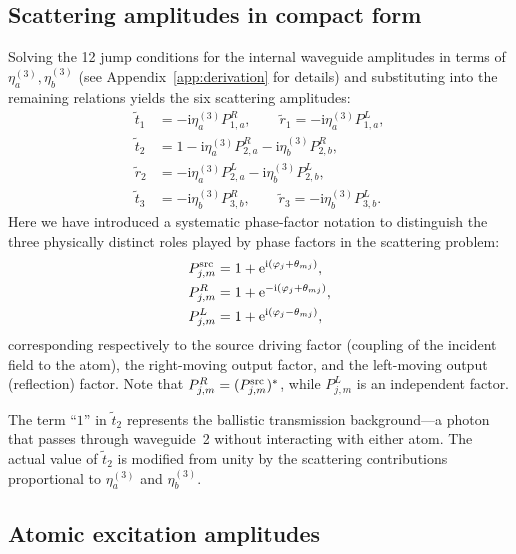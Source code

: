 \documentclass[aps,pra,reprint,superscriptaddress,nofootinbib,longbibliography,floatfix]{revtex4-2}
\newcommand{\ii}{\mathrm{i}}
\newcommand{\ee}{\mathrm{e}}
\newcommand{\ph}{\varphi}
\begin{document}
\subsection{Scattering amplitudes in compact form}

Solving the 12 jump conditions for the internal waveguide amplitudes in terms of $\eta_a^{(3)},\eta_b^{(3)}$ (see Appendix~\ref{app:derivation} for details) and substituting into the remaining relations yields the six scattering amplitudes:
\begin{subequations}
\label{eq:wg2_amps}
\begin{align}
\tilde t_1 &= -\ii\eta_a^{(3)} P_{1,a}^{R}, \qquad
\tilde r_1 = -\ii\eta_a^{(3)} P_{1,a}^{L},\\[2pt]
\tilde t_2 &= 1 - \ii\eta_a^{(3)} P_{2,a}^{R} - \ii\eta_b^{(3)} P_{2,b}^{R},\\[2pt]
\tilde r_2 &= -\ii\eta_a^{(3)} P_{2,a}^{L} - \ii\eta_b^{(3)} P_{2,b}^{L},\\[2pt]
\tilde t_3 &= -\ii\eta_b^{(3)} P_{3,b}^{R}, \qquad
\tilde r_3 = -\ii\eta_b^{(3)} P_{3,b}^{L}.
\end{align}
\end{subequations}
Here we have introduced a systematic phase-factor notation to distinguish the three physically distinct roles played by phase factors in the scattering problem:
\begin{equation}
\begin{aligned}
P_{j,m}^{\rm src} &= 1+\ee^{\ii(\ph_j+\theta_{mj})},\\
P_{j,m}^{R} &= 1+\ee^{-\ii(\ph_j+\theta_{mj})},\\
P_{j,m}^{L} &= 1+\ee^{\ii(\ph_j-\theta_{mj})},
\end{aligned}
\label{eq:Pnotation}
\end{equation}
corresponding respectively to the source driving factor (coupling of the incident field to the atom), the right-moving output factor, and the left-moving output (reflection) factor.
Note that $P_{j,m}^{R} = (P_{j,m}^{\rm src})^*$, while $P_{j,m}^{L}$ is an independent factor.

The term ``$1$'' in $\tilde t_2$ represents the ballistic transmission background---a photon that passes through waveguide~2 without interacting with either atom.
The actual value of $\tilde t_2$ is modified from unity by the scattering contributions proportional to $\eta_a^{(3)}$ and $\eta_b^{(3)}$.

\subsection{Atomic excitation amplitudes}
\end{document}
